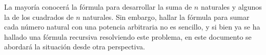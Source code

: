 
La mayoría conocerá la fórmula para desarrollar la suma de $n$ naturales y algunos la de los cuadrados de $n$ naturales. Sin embargo, hallar la fórmula para sumar cada número natural con una potencia arbitraria no es sencillo, y si bien ya se ha hallado una fórmula recursiva resolviendo este problema, en este documento se abordará la situación desde otra perspectiva.